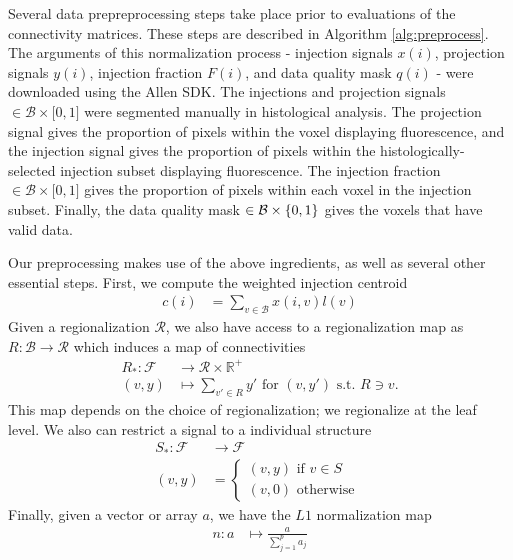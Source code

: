 Several data prepreprocessing steps take place prior to evaluations of the connectivity matrices.
These steps are described in Algorithm \ref{alg:preprocess}.
The arguments of this normalization process - injection signals $x(i)$, projection signals $y(i)$, injection fraction $F(i)$, and data quality mask $q(i)$ - were downloaded using the Allen SDK. %
The injections and projection signals $\in \mathcal B \times \mathbb [0,1]$ were segmented manually in histological analysis.
The projection signal gives the proportion of pixels within the voxel displaying fluorescence, and the injection signal gives the proportion of pixels within the histologically-selected injection subset displaying fluorescence.
The injection fraction $\in \mathcal B \times \mathbb [0,1]$ gives the proportion of pixels within each voxel in the injection subset.
Finally, the data quality mask $\in \mathcal B \times \mathbb \{0,1\}$ gives the voxels that have valid data.

Our preprocessing makes use of the above ingredients, as well as several other essential steps.
First, we compute the weighted injection centroid
\begin{eqnarray*}
c(i) &= \sum_{v \in \mathcal B} x(i,v) l(v) 
\end{eqnarray*}
Given a regionalization $\mathcal R$, we also have access to a regionalization map as $R: \mathcal B  \to \mathcal R $ which induces a map of connectivities 
\begin{eqnarray*}
R_*: \mathcal F &\to \mathcal R \times \mathbb R^+ \\
(v, y) &\mapsto \sum_{v' \in R} y'  \text{ for } (v,y') \text{ s.t. } R \ni v.
\end{eqnarray*}
This map depends on the choice of regionalization; we regionalize at the leaf level.
We also can restrict a signal to a individual structure
\begin{eqnarray*}
S_* :  \mathcal F &\to  \mathcal F \\
 (v, y) &= \begin{cases} 
 (v, y) \text{ if } v \in S \\
 (v, 0) \text{ otherwise }
 \end{cases}
\end{eqnarray*}
Finally, given a vector or array $a$, we have the $L1$ normalization map
\begin{eqnarray*}
n: a &\mapsto \frac{a}{\sum_{j = 1}^p a_j}
\end{eqnarray*}

